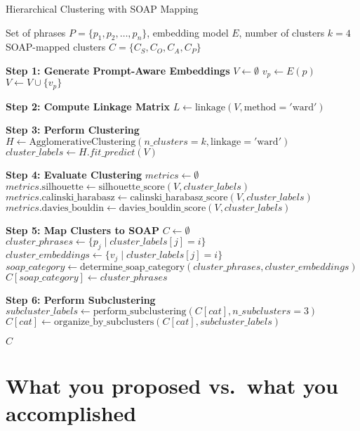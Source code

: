 \documentclass[11pt,a4paper]{article}
\begin{document}
\begin{algorithm}[H]
\caption{Hierarchical Clustering with SOAP Mapping}
\label{alg:hierarchical_clustering}
\begin{algorithmic}[1]
\REQUIRE Set of phrases $P = \{p_1, p_2, \ldots, p_n\}$, embedding model $E$, number of clusters $k=4$
\ENSURE SOAP-mapped clusters $C = \{C_S, C_O, C_A, C_P\}$

\STATE \textbf{Step 1: Generate Prompt-Aware Embeddings}
\STATE $V \gets \emptyset$ 
    \STATE $v_p \gets E(p)$ 
    \STATE $V \gets V \cup \{v_p\}$
\ENDFOR

\STATE \textbf{Step 2: Compute Linkage Matrix}
\STATE $L \gets \text{linkage}(V, \text{method}='\text{ward}')$ 

\STATE \textbf{Step 3: Perform Clustering}
\STATE $H \gets \text{AgglomerativeClustering}(n\_clusters=k, \text{linkage}='\text{ward}')$
\STATE $cluster\_labels \gets H.fit\_predict(V)$

\STATE \textbf{Step 4: Evaluate Clustering}
\STATE $metrics \gets \emptyset$
    \STATE $metrics.\text{silhouette} \gets \text{silhouette\_score}(V, cluster\_labels)$
    \STATE $metrics.\text{calinski\_harabasz} \gets \text{calinski\_harabasz\_score}(V, cluster\_labels)$
    \STATE $metrics.\text{davies\_bouldin} \gets \text{davies\_bouldin\_score}(V, cluster\_labels)$
\ENDIF

\STATE \textbf{Step 5: Map Clusters to SOAP}
\STATE $C \gets \emptyset$
    \STATE $cluster\_phrases \gets \{p_j \mid cluster\_labels[j] = i\}$
    \STATE $cluster\_embeddings \gets \{v_j \mid cluster\_labels[j] = i\}$
    \STATE $soap\_category \gets \text{determine\_soap\_category}(cluster\_phrases, cluster\_embeddings)$
    \STATE $C[soap\_category] \gets cluster\_phrases$
\ENDFOR

\STATE \textbf{Step 6: Perform Subclustering}
    \STATE $subcluster\_labels \gets \text{perform\_subclustering}(C[cat], n\_subclusters=3)$
    \STATE $C[cat] \gets \text{organize\_by\_subclusters}(C[cat], subcluster\_labels)$
\ENDFOR

\RETURN $C$

\end{algorithmic}
\end{algorithm}

\section{What you proposed vs.\ what you accomplished}
\end{document}
